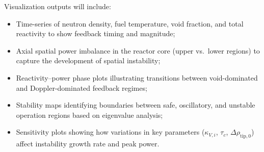 \documentclass[11pt]{article}
\begin{document}
Visualization outputs will include:
\begin{itemize}
\item Time-series of neutron density, fuel temperature, void fraction, and total reactivity to show feedback timing and magnitude;
\item Axial spatial power imbalance in the reactor core (upper vs.\ lower regions) to capture the development of spatial instability;
\item Reactivity--power phase plots illustrating transitions between void-dominated and Doppler-dominated feedback regimes;
\item Stability maps identifying boundaries between safe, oscillatory, and unstable operation regions based on eigenvalue analysis;
\item Sensitivity plots showing how variations in key parameters ($\kappa_{V,i}$, $\tau_c$, $\Delta\rho_{\mathrm{tip},0}$) affect instability growth rate and peak power.
\end{itemize}




{
\footnotesize %

}
\end{document}
